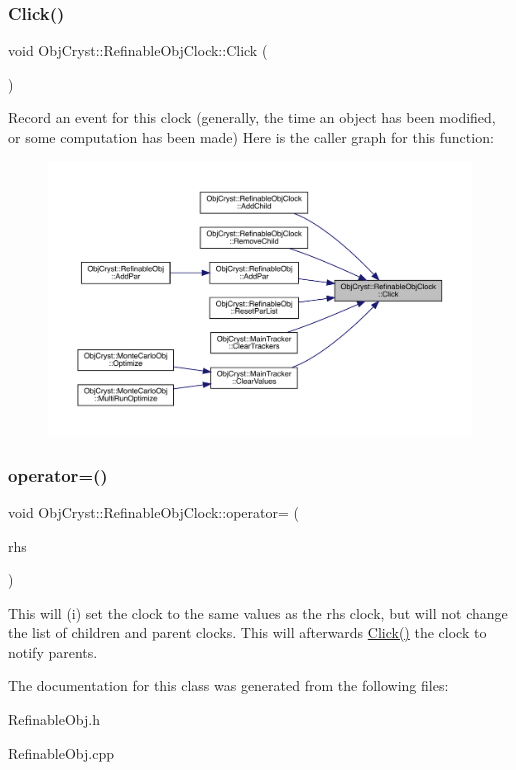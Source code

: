 \subsubsection{\texorpdfstring{Click()}{Click()}}
{\footnotesize\ttfamily void Obj\+Cryst\+::\+Refinable\+Obj\+Clock\+::\+Click (\begin{DoxyParamCaption}{ }\end{DoxyParamCaption})}

Record an event for this clock (generally, the \textquotesingle{}time\textquotesingle{} an object has been modified, or some computation has been made) Here is the caller graph for this function\+:
\nopagebreak
\begin{figure}[H]
\begin{center}
\leavevmode
\includegraphics[width=350pt]{class_obj_cryst_1_1_refinable_obj_clock_a980b7dc70decc75c58eba0a55d73fc6d_icgraph}
\end{center}
\end{figure}
\mbox{\label{class_obj_cryst_1_1_refinable_obj_clock_a91eda9a56505c36e5f060672e4959a58}} 
\subsubsection{\texorpdfstring{operator=()}{operator=()}}
{\footnotesize\ttfamily void Obj\+Cryst\+::\+Refinable\+Obj\+Clock\+::operator= (\begin{DoxyParamCaption}\item[{const \mbox{\hyperlink{class_obj_cryst_1_1_refinable_obj_clock}{Refinable\+Obj\+Clock}} \&}]{rhs }\end{DoxyParamCaption})}

This will (i) set the clock to the same values as the rhs clock, but will not change the list of children and parent clocks. This will afterwards \mbox{\hyperlink{class_obj_cryst_1_1_refinable_obj_clock_a980b7dc70decc75c58eba0a55d73fc6d}{Click()}} the clock to notify parents. 

The documentation for this class was generated from the following files\+:\begin{DoxyCompactItemize}
\item 
Refinable\+Obj.\+h\item 
Refinable\+Obj.\+cpp\end{DoxyCompactItemize}
